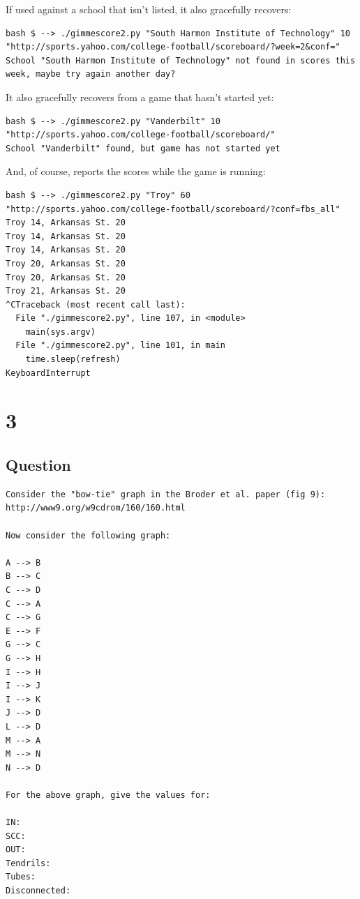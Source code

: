 \documentclass[letterpaper,11pt]{article}
\begin{document}
If used against a school that isn't listed, it also gracefully recovers:
\begin{lstlisting}[frame=single]
bash $ --> ./gimmescore2.py "South Harmon Institute of Technology" 10 "http://sports.yahoo.com/college-football/scoreboard/?week=2&conf="
School "South Harmon Institute of Technology" not found in scores this week, maybe try again another day?
\end{lstlisting}

It also gracefully recovers from a game that hasn't started yet:
\begin{lstlisting}[frame=single]
bash $ --> ./gimmescore2.py "Vanderbilt" 10 "http://sports.yahoo.com/college-football/scoreboard/"
School "Vanderbilt" found, but game has not started yet
\end{lstlisting}

\newpage
And, of course, reports the scores while the game is running:

\begin{lstlisting}[frame=single]
bash $ --> ./gimmescore2.py "Troy" 60 "http://sports.yahoo.com/college-football/scoreboard/?conf=fbs_all"
Troy 14, Arkansas St. 20
Troy 14, Arkansas St. 20
Troy 14, Arkansas St. 20
Troy 20, Arkansas St. 20
Troy 20, Arkansas St. 20
Troy 21, Arkansas St. 20
^CTraceback (most recent call last):
  File "./gimmescore2.py", line 107, in <module>
    main(sys.argv)
  File "./gimmescore2.py", line 101, in main
    time.sleep(refresh)
KeyboardInterrupt
\end{lstlisting}

\newpage




\newpage
\section*{3}

\subsection*{Question}

\begin{verbatim}
Consider the "bow-tie" graph in the Broder et al. paper (fig 9):
http://www9.org/w9cdrom/160/160.html

Now consider the following graph:

A --> B
B --> C
C --> D
C --> A
C --> G
E --> F
G --> C
G --> H
I --> H
I --> J
I --> K
J --> D 
L --> D
M --> A
M --> N
N --> D
    
For the above graph, give the values for:

IN: 
SCC: 
OUT: 
Tendrils: 
Tubes: 
Disconnected:
\end{verbatim}
\end{document}
